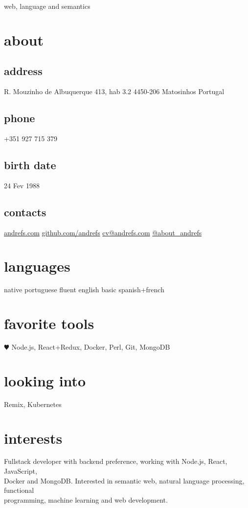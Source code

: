 \documentclass[a4paper]{friggeri-cv}
\begin{document}
       {web, language and semantics}



\begin{aside}
  \section{about}
\begin{sensitive}
    \subsection{address}
    {\small R. Mouzinho de Albuquerque 413,
    hab 3.2
    4450-206 Matosinhos
    Portugal}
    \subsection{phone}
    +351 927 715 379
    \subsection{birth date}
    24 Fev 1988
\end{sensitive}
    \subsection{contacts}
    \url{andrefs.com}
    \url{github.com/andrefs} \faGithub
    \href{mailto:cv@andrefs.com}{cv@andrefs.com} \faEnvelope
    \href{http://witter.com/about_andrefs}{@about\_andrefs} \faTwitter
  \section{languages}
    native portuguese
    fluent english
    basic spanish+french
  \section{favorite tools}
    {$\varheartsuit$} Node.js, React+Redux, Docker, Perl, Git, MongoDB
  \section{looking into}
   {} Remix, Kubernetes
\end{aside}

\section{interests}
{Fullstack developer with backend preference, working with
Node.js, React, JavaScript,\\ Docker and MongoDB. Interested in semantic web, natural
language processing, functional\\programming,  machine learning and web development.}
\end{document}
